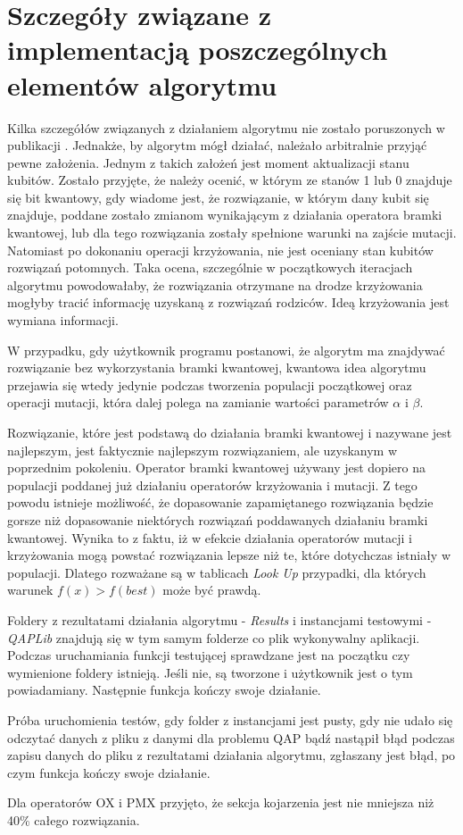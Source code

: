 \section{Szczegóły związane z implementacją poszczególnych elementów algorytmu}
Kilka szczegółów związanych z działaniem algorytmu nie zostało poruszonych w publikacji \cite{NPQGA}. Jednakże, by algorytm mógł działać, należało arbitralnie przyjąć pewne założenia. Jednym z takich założeń jest moment aktualizacji stanu kubitów. Zostało przyjęte, że należy ocenić, w którym ze stanów 1 lub 0 znajduje się bit kwantowy, gdy wiadome jest, że rozwiązanie, w którym dany kubit się znajduje, poddane zostało zmianom wynikającym z działania operatora bramki kwantowej, lub dla tego rozwiązania zostały spełnione warunki na zajście mutacji. Natomiast po dokonaniu operacji krzyżowania, nie jest oceniany stan kubitów rozwiązań potomnych. Taka ocena, szczególnie w początkowych iteracjach algorytmu powodowałaby, że rozwiązania otrzymane na drodze krzyżowania mogłyby tracić informację uzyskaną z rozwiązań rodziców. Ideą krzyżowania jest wymiana informacji.

W przypadku, gdy użytkownik programu postanowi, że algorytm ma znajdywać rozwiązanie bez wykorzystania bramki kwantowej, kwantowa idea algorytmu przejawia się wtedy jedynie podczas tworzenia populacji początkowej oraz operacji mutacji, która dalej polega na zamianie wartości parametrów $\alpha$ i $\beta$.

Rozwiązanie, które jest podstawą do działania bramki kwantowej i nazywane jest najlepszym, jest faktycznie najlepszym rozwiązaniem, ale uzyskanym w poprzednim pokoleniu. Operator bramki kwantowej używany jest dopiero na populacji poddanej już działaniu operatorów krzyżowania i mutacji. Z tego powodu istnieje możliwość, że dopasowanie zapamiętanego rozwiązania będzie gorsze niż dopasowanie niektórych rozwiązań poddawanych działaniu bramki kwantowej. Wynika to z faktu, iż w efekcie działania operatorów mutacji i krzyżowania mogą powstać rozwiązania lepsze niż te, które dotychczas istniały w populacji. Dlatego rozważane są w tablicach \textit{Look Up} przypadki, dla których warunek $f(x)>f(best)$ może być prawdą.

Foldery z rezultatami działania algorytmu - \textit{Results} i instancjami testowymi - \textit{QAPLib} znajdują się w tym samym folderze co plik wykonywalny aplikacji. Podczas uruchamiania funkcji testującej sprawdzane jest na początku czy wymienione foldery istnieją. Jeśli nie, są tworzone i użytkownik jest o tym powiadamiany. Następnie funkcja kończy swoje działanie.

Próba uruchomienia testów, gdy folder z instancjami jest pusty, gdy nie udało się odczytać danych z pliku z danymi dla problemu QAP bądź nastąpił błąd podczas zapisu danych do pliku z rezultatami działania algorytmu, zgłaszany jest błąd, po czym funkcja kończy swoje działanie.

Dla operatorów OX i PMX przyjęto, że sekcja kojarzenia jest nie mniejsza niż 40\% całego rozwiązania.